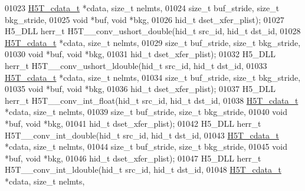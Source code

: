 \begin{DoxyCode}
01023                      \hyperlink{struct_h5_t__cdata__t}{H5T\_cdata\_t} *cdata, \textcolor{keywordtype}{size\_t} nelmts,
01024                      \textcolor{keywordtype}{size\_t} buf\_stride, \textcolor{keywordtype}{size\_t} bkg\_stride,
01025                                      \textcolor{keywordtype}{void} *buf, \textcolor{keywordtype}{void} *bkg,
01026                                      hid\_t dset\_xfer\_plist);
01027 H5\_DLL herr\_t H5T\_\_conv\_ushort\_double(hid\_t src\_id, hid\_t dst\_id,
01028                      \hyperlink{struct_h5_t__cdata__t}{H5T\_cdata\_t} *cdata, \textcolor{keywordtype}{size\_t} nelmts,
01029                      \textcolor{keywordtype}{size\_t} buf\_stride, \textcolor{keywordtype}{size\_t} bkg\_stride,
01030                                      \textcolor{keywordtype}{void} *buf, \textcolor{keywordtype}{void} *bkg,
01031                                      hid\_t dset\_xfer\_plist);
01032 H5\_DLL herr\_t H5T\_\_conv\_ushort\_ldouble(hid\_t src\_id, hid\_t dst\_id,
01033                      \hyperlink{struct_h5_t__cdata__t}{H5T\_cdata\_t} *cdata, \textcolor{keywordtype}{size\_t} nelmts,
01034                      \textcolor{keywordtype}{size\_t} buf\_stride, \textcolor{keywordtype}{size\_t} bkg\_stride,
01035                                      \textcolor{keywordtype}{void} *buf, \textcolor{keywordtype}{void} *bkg,
01036                                      hid\_t dset\_xfer\_plist);
01037 H5\_DLL herr\_t H5T\_\_conv\_int\_float(hid\_t src\_id, hid\_t dst\_id,
01038                      \hyperlink{struct_h5_t__cdata__t}{H5T\_cdata\_t} *cdata, \textcolor{keywordtype}{size\_t} nelmts,
01039                      \textcolor{keywordtype}{size\_t} buf\_stride, \textcolor{keywordtype}{size\_t} bkg\_stride,
01040                                      \textcolor{keywordtype}{void} *buf, \textcolor{keywordtype}{void} *bkg,
01041                                      hid\_t dset\_xfer\_plist);
01042 H5\_DLL herr\_t H5T\_\_conv\_int\_double(hid\_t src\_id, hid\_t dst\_id,
01043                      \hyperlink{struct_h5_t__cdata__t}{H5T\_cdata\_t} *cdata, \textcolor{keywordtype}{size\_t} nelmts,
01044                      \textcolor{keywordtype}{size\_t} buf\_stride, \textcolor{keywordtype}{size\_t} bkg\_stride,
01045                                      \textcolor{keywordtype}{void} *buf, \textcolor{keywordtype}{void} *bkg,
01046                                      hid\_t dset\_xfer\_plist);
01047 H5\_DLL herr\_t H5T\_\_conv\_int\_ldouble(hid\_t src\_id, hid\_t dst\_id,
01048                      \hyperlink{struct_h5_t__cdata__t}{H5T\_cdata\_t} *cdata, \textcolor{keywordtype}{size\_t} nelmts,

\end{DoxyCode}

